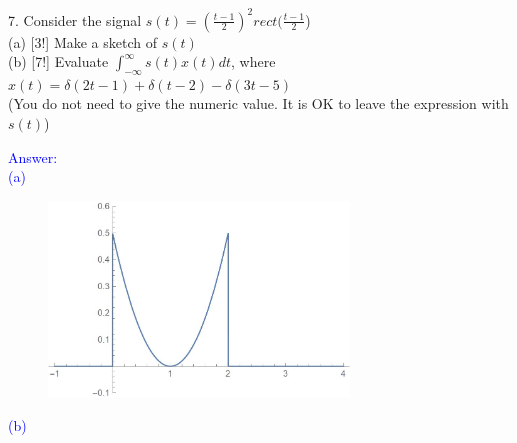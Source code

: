 \documentclass[12pt,a4paper]{article}
\begin{document}
\begin{tcolorbox}[colback = white]
7. Consider the signal $s(t)=(\frac{t-1}{2})^2rect(\frac{t-1}{2}$)\\
(a) [3!] Make a sketch of $s(t)$\\
(b) [7!] Evaluate $\int_{-\infty}^{\infty}s(t)x(t)dt$, where $x(t)=\delta(2t-1)+\delta(t-2)-\delta(3t-5)$\\
(You do not need to give the numeric value. It is OK to leave the expression with $s(t)$)
\end{tcolorbox}
\begin{tcolorbox}
\normalsize
\textcolor{blue}{Answer:\\
(a)
\begin{figure}[H]
    \centering
    \includegraphics[width=8cm]{7a.jpg}
\end{figure}
(b) 
}
\end{tcolorbox}
\end{document}
